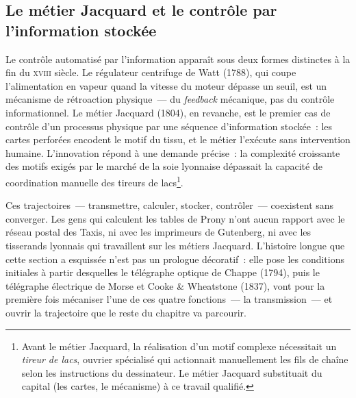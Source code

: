 \subsection{Le métier Jacquard et le contrôle par l'information stockée}\label{subsec:jacquard}

Le contrôle automatisé par l'information apparaît sous deux formes distinctes à la fin du \textsc{xviii}\ieme{} siècle. Le régulateur centrifuge de Watt (1788), qui coupe l'alimentation en vapeur quand la vitesse du moteur dépasse un seuil, est un mécanisme de rétroaction physique~--- du \emph{feedback} mécanique, pas du contrôle informationnel. Le métier Jacquard (1804), en revanche, est le premier cas de contrôle d'un processus physique par une séquence d'information stockée~: les cartes perforées encodent le motif du tissu, et le métier l'exécute sans intervention humaine. %
L'innovation répond à une demande précise~: la complexité croissante des motifs exigés par le marché de la soie lyonnaise dépassait la capacité de coordination manuelle des tireurs de lacs\footnote{Avant le métier Jacquard, la réalisation d'un motif complexe nécessitait un \emph{tireur de lacs}, ouvrier spécialisé qui actionnait manuellement les fils de chaîne selon les instructions du dessinateur. Le métier Jacquard substituait du capital (les cartes, le mécanisme) à ce travail qualifié.}.

Ces trajectoires~--- transmettre, calculer, stocker, contrôler~--- coexistent sans converger. Les gens qui calculent les tables de Prony n'ont aucun rapport avec le réseau postal des Taxis, ni avec les imprimeurs de Gutenberg, ni avec les tisserands lyonnais qui travaillent sur les métiers Jacquard. L'histoire longue que cette section a esquissée n'est pas un prologue décoratif~: elle pose les conditions initiales à partir desquelles le télégraphe optique de Chappe (1794), puis le télégraphe électrique de Morse et Cooke \& Wheatstone (1837), vont pour la première fois mécaniser l'une de ces quatre fonctions~--- la transmission~--- et ouvrir la trajectoire que le reste du chapitre va parcourir.




